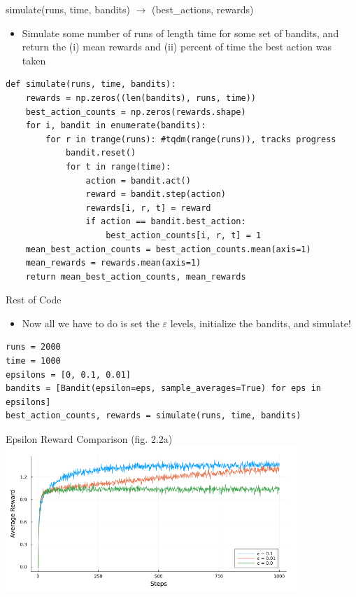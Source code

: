 \documentclass{beamer}
\begin{document}
\begin{frame}[fragile]{simulate(runs, time, bandits) $\to$ (best\_actions, rewards)}
\begin{itemize}
	\item Simulate some number of runs of length time for some set of bandits, and return the (i) mean rewards and (ii) percent of time the best action was taken
\end{itemize}
\begin{lstlisting}
def simulate(runs, time, bandits):
    rewards = np.zeros((len(bandits), runs, time))
    best_action_counts = np.zeros(rewards.shape)
    for i, bandit in enumerate(bandits):
        for r in trange(runs): #tqdm(range(runs)), tracks progress
            bandit.reset()
            for t in range(time):
                action = bandit.act()
                reward = bandit.step(action)
                rewards[i, r, t] = reward
                if action == bandit.best_action:
                    best_action_counts[i, r, t] = 1
    mean_best_action_counts = best_action_counts.mean(axis=1)
    mean_rewards = rewards.mean(axis=1)
    return mean_best_action_counts, mean_rewards
\end{lstlisting}
\end{frame}
\begin{frame}[fragile]{Rest of Code}
\begin{itemize}
	\item Now all we have to do is set the $\varepsilon$ levels, initialize the bandits, and simulate!
\end{itemize}
\begin{lstlisting}
runs = 2000
time = 1000
epsilons = [0, 0.1, 0.01]
bandits = [Bandit(epsilon=eps, sample_averages=True) for eps in epsilons]
best_action_counts, rewards = simulate(runs, time, bandits)
\end{lstlisting}
\end{frame}
  
  \begin{frame}{Epsilon Reward Comparison (fig. 2.2a)}
  	\includegraphics[width=11cm]{ten_armed_testbed_epsilon_greedy.png}
  \end{frame}
  
\end{document}
